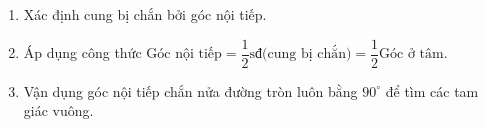 \begin{enumerate}
\item Xác định cung bị chắn bởi góc nội tiếp.
\item Áp dụng công thức $\text{Góc nội tiếp} = \dfrac{1}{2}\text{sđ(cung bị chắn)} = \dfrac{1}{2}\text{Góc ở tâm}$.
\item Vận dụng góc nội tiếp chắn nửa đường tròn luôn bằng $90^\circ$ để tìm các tam giác vuông.
\end{enumerate}
